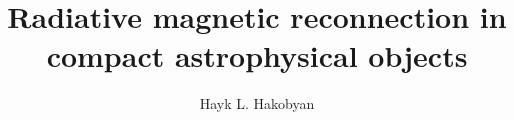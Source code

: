 \title{Radiative magnetic reconnection in compact astrophysical objects}
\author{Hayk L. Hakobyan}


